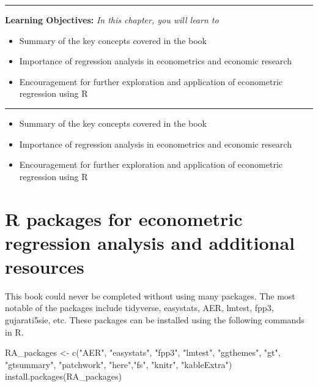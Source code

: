 \documentclass[
  letterpaper,
  paper =a4,
  twoside,
  openright,
  headsepline,
  footsepline,
  listof = totocnumbered,
  chapterprefix = true,
  firstiscover]{scrbook}
\newenvironment{Shaded}{\begin{snugshade}}{\end{snugshade}}
\newcommand{\FunctionTok}[1]{\textcolor[rgb]{0.28,0.35,0.67}{#1}}
\newcommand{\NormalTok}[1]{\textcolor[rgb]{0.00,0.23,0.31}{#1}}
\newcommand{\OtherTok}[1]{\textcolor[rgb]{0.00,0.23,0.31}{#1}}
\newcommand{\StringTok}[1]{\textcolor[rgb]{0.13,0.47,0.30}{#1}}
\providecommand{\abstractname}{Learning Objectives} %
\newenvironment{objectives}[1]{%
	\hrule
	\vspace{5pt}
	\small\textbf{\abstractname: } 
	\newline
	\vspace{0.1cm}
	\small\emph{#1} %
	\itshape %
}{%
	\vspace{5pt}
	\hrule
	\vspace{0.6cm}
}
\begin{document}
\begin{objectives}{In this chapter, you will learn to}
\begin{itemize}

\item{Summary of the key concepts covered in the book}

\item{Importance of regression analysis in econometrics and economic research}

\item{Encouragement for further exploration and application of econometric regression using R}

\end{itemize}

\end{objectives}

\begin{itemize}
\item
  Summary of the key concepts covered in the book
\item
  Importance of regression analysis in econometrics and economic
  research
\item
  Encouragement for further exploration and application of econometric
  regression using R
\end{itemize}

\cleardoublepage
{}
{}
\appendix

\hypertarget{r-packages-for-econometric-regression-analysis-and-additional-resources}{%
\chapter{R packages for econometric regression analysis and additional
resources}\label{r-packages-for-econometric-regression-analysis-and-additional-resources}}

\setcounter{figure}{0} 
\renewcommand{\thefigure}{A.\arabic{figure}}
\setcounter{table}{0} 
\renewcommand{\thetable}{A.\arabic{table}}

This book could never be completed without using many packages. The most
notable of the packages include tidyverse, easystats, AER, lmtest, fpp3,
gujarati5sie, etc. These packages can be installed using the following
commands in R.

\begin{Shaded}
\begin{Highlighting}[numbers=left,,]
\NormalTok{RA\_packages }\OtherTok{\textless{}{-}} \FunctionTok{c}\NormalTok{(}\StringTok{"AER"}\NormalTok{,}
                 \StringTok{"easystats"}\NormalTok{,}
                 \StringTok{"fpp3"}\NormalTok{,}
                 \StringTok{"lmtest"}\NormalTok{,}
                 \StringTok{"ggthemes"}\NormalTok{,}
                 \StringTok{"gt"}\NormalTok{,}
                 \StringTok{"gtsummary"}\NormalTok{,}
                 \StringTok{"patchwork"}\NormalTok{,}
                 \StringTok{"here"}\NormalTok{,}\StringTok{"fs"}\NormalTok{,}
                 \StringTok{"knitr"}\NormalTok{,}
                 \StringTok{"kableExtra"}\NormalTok{)}
\FunctionTok{install.packages}\NormalTok{(RA\_packages)}
\end{Highlighting}
\end{Shaded}
\end{document}
